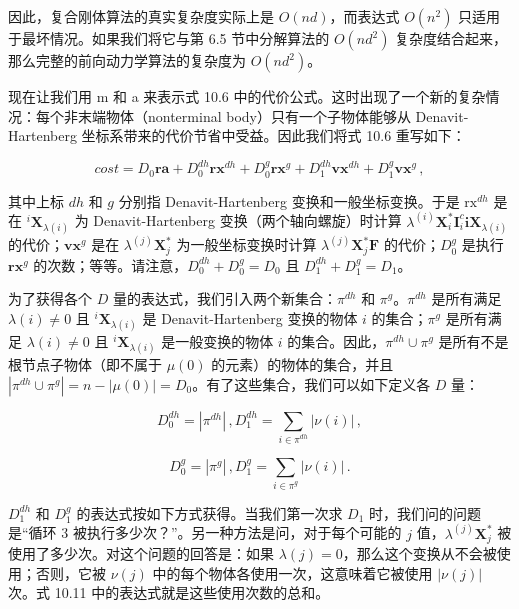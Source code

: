 \documentclass[10pt,a4paper]{book}
\theoremstyle{thmstyle} %
\theoremstyle{defstyle} %
\theoremstyle{prostyle} %
\begin{document}
因此，复合刚体算法的真实复杂度实际上是 $O(nd)$，而表达式 $O(n^2)$ 只适用于最坏情况。如果我们将它与第 6.5 节中分解算法的 $O(nd^2)$ 复杂度结合起来，那么完整的前向动力学算法的复杂度为 $O(nd^2)$。



现在让我们用 m 和 a 来表示式 10.6 中的代价公式。这时出现了一个新的复杂情况：每个非末端物体（nonterminal body）只有一个子物体能够从 Denavit-Hartenberg 坐标系带来的代价节省中受益。因此我们将式 10.6 重写如下：



$$
c o s t = D _ { 0 } \mathbf { r a } + D _ { 0 }^{d h} \mathbf { r x }^{d h} + D _ { 0 }^{g} \mathbf { r x }^{g} + D _ { 1 }^{d h} \mathbf { v x }^{d h} + D _ { 1 }^{g} \mathbf { v x }^{g} \, ,
$$



其中上标 $dh$ 和 $g$ 分别指 Denavit-Hartenberg 变换和一般坐标变换。于是 $\mathrm{rx}^{dh}$ 是在 $^{i}\mathbf{X}_{\lambda(i)}$ 为 Denavit-Hartenberg 变换（两个轴向螺旋）时计算 $\lambda^{(i)}\mathbf{X}_{i}^{*}\mathbf{I}_{i}^{c}\mathbf{i}\mathbf{X}_{\lambda(i)}$ 的代价；$\mathbf{v}\mathbf{x}^{g}$ 是在 $\lambda^{(j)}\mathbf{X}_{j}^{*}$ 为一般坐标变换时计算 $\lambda^{(j)}\mathbf{X}_{j}^{*}\mathbf{F}$ 的代价；$D_{0}^{g}$ 是执行 $\mathbf{r}\mathbf{x}^{g}$ 的次数；等等。请注意，$D_{0}^{dh}+D_{0}^{g}=D_{0}$ 且 $D_{1}^{dh}+D_{1}^{g}=D_{1}$。



为了获得各个 $D$ 量的表达式，我们引入两个新集合：$\pi^{dh}$ 和 $\pi^{g}$。$\pi^{dh}$ 是所有满足 $\lambda(i) \neq 0$ 且 ${}^{i}\mathbf{X}_{\lambda(i)}$ 是 Denavit-Hartenberg 变换的物体 $i$ 的集合；$\pi^{g}$ 是所有满足 $\lambda(i) \neq 0$ 且 ${}^{i}\mathbf{X}_{\lambda(i)}$ 是一般变换的物体 $i$ 的集合。因此，$\pi^{dh} \cup \pi^{g}$ 是所有不是根节点子物体（即不属于 $\mu(0)$ 的元素）的物体的集合，并且 $|\pi^{dh} \cup \pi^{g}| = n - |\mu(0)| = D_{0}$。有了这些集合，我们可以如下定义各 $D$ 量：



$$
D _ { 0 }^{d h} = | \pi ^{d h} | \, ,  D _ { 1 }^{d h} = \sum _ { i \in \pi ^{d h} } | \nu ( i ) | \, ,
$$



$$
D _ { 0 }^{g} = | \pi ^{g} | \, ,   D _ { 1 }^{g} = \sum _ { i \in \pi ^{g} } | \nu ( i ) | \, .
$$



$D_{1}^{dh}$ 和 $D_{1}^{g}$ 的表达式按如下方式获得。当我们第一次求 $D_{1}$ 时，我们问的问题是“循环 3 被执行多少次？”。另一种方法是问，对于每个可能的 $j$ 值，$\lambda^{(j)}\mathbf{X}_{j}^{*}$ 被使用了多少次。对这个问题的回答是：如果 $\lambda(j)=0$，那么这个变换从不会被使用；否则，它被 $\nu(j)$ 中的每个物体各使用一次，这意味着它被使用 $|\nu(j)|$ 次。式 10.11 中的表达式就是这些使用次数的总和。
\end{document}
